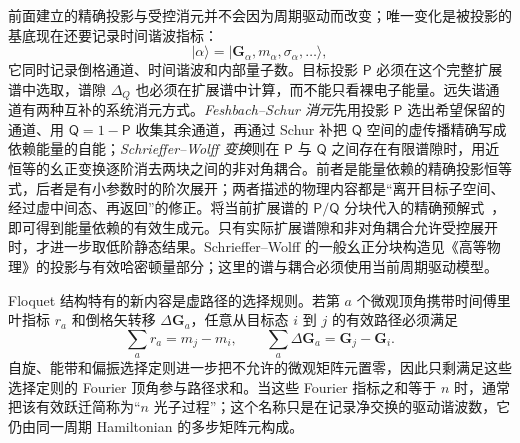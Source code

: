 前面建立的精确投影与受控消元并不会因为周期驱动而改变；唯一变化是被投影的基底现在还要记录时间谐波指标：
\begin{equation*}
|\alpha\rangle
=|\mathbf G_\alpha,m_\alpha,\sigma_\alpha,\ldots\rangle,
\end{equation*}
它同时记录倒格通道、时间谐波和内部量子数。目标投影 $\mathsf P$ 必须在这个完整扩展谱中选取，谱隙 $\Delta_Q$ 也必须在扩展谱中计算，而不能只看裸电子能量。远失谐通道有两种互补的系统消元方式。\emph{Feshbach--Schur 消元}先用投影 $\mathsf P$ 选出希望保留的通道、用 $\mathsf Q=1-\mathsf P$ 收集其余通道，再通过 Schur 补把 $\mathsf Q$ 空间的虚传播精确写成依赖能量的自能；\emph{Schrieffer--Wolff 变换}则在 $\mathsf P$ 与 $\mathsf Q$ 之间存在有限谱隙时，用近恒等的幺正变换逐阶消去两块之间的非对角耦合。前者是能量依赖的精确投影恒等式，后者是有小参数时的阶次展开；两者描述的物理内容都是“离开目标子空间、经过虚中间态、再返回”的修正。将当前扩展谱的 $\mathsf P/\mathsf Q$ 分块代入的精确预解式~，即可得到能量依赖的有效生成元。只有实际扩展谱隙和非对角耦合允许受控展开时，才进一步取低阶静态结果。Schrieffer--Wolff 的一般幺正分块构造见《高等物理》的投影与有效哈密顿量部分；这里的谱与耦合必须使用当前周期驱动模型。

Floquet 结构特有的新内容是虚路径的选择规则。若第 $a$ 个微观顶角携带时间傅里叶指标 $r_a$ 和倒格矢转移 $\Delta\mathbf G_a$，任意从目标态 $i$ 到 $j$ 的有效路径必须满足
\begin{equation}
\boxed{
\sum_a r_a=m_j-m_i,
\qquad
\sum_a\Delta\mathbf G_a=\mathbf G_j-\mathbf G_i.}
\label{eq:floquet-virtual-path-selection-dp19}
\end{equation}
自旋、能带和偏振选择定则进一步把不允许的微观矩阵元置零，因此只剩满足这些选择定则的 Fourier 顶角参与路径求和。当这些 Fourier 指标之和等于 $n$ 时，通常把该有效跃迁简称为“$n$ 光子过程”；这个名称只是在记录净交换的驱动谐波数，它仍由同一周期 Hamiltonian 的多步矩阵元构成。

